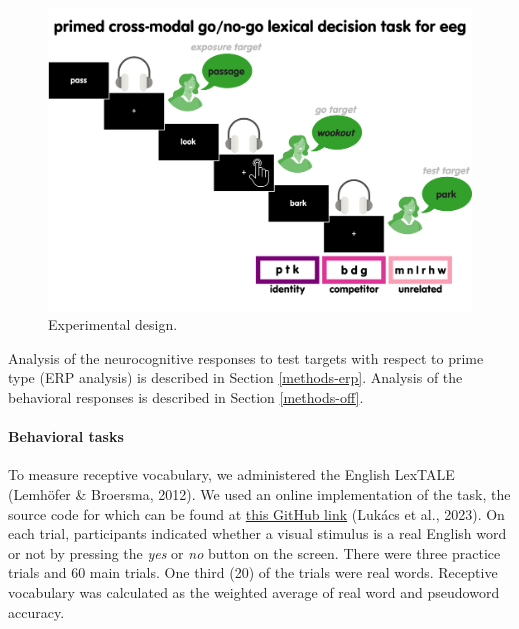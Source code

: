 \documentclass[
  12pt,
  twoside]{article}
\begin{document}
\begin{figure}[H]

{\centering \includegraphics[width=\textwidth]{figures/diss_eeg} 

}

\caption{Experimental design.}\label{fig:study2-fig}
\end{figure}

Analysis of the neurocognitive responses to test targets with respect to prime type (ERP analysis) is described in Section \ref{methods-erp}.
Analysis of the behavioral responses is described in Section \ref{methods-off}.

\hypertarget{behavioral-tasks}{%
\paragraph{Behavioral tasks}\label{behavioral-tasks}}

To measure receptive vocabulary, we administered the English LexTALE (Lemhöfer \& Broersma, 2012).
We used an online implementation of the task, the source code for which can be found at \href{https://github.com/gasparl/lextale}{this GitHub link} (Lukács et al., 2023).
On each trial, participants indicated whether a visual stimulus is a real English word or not by pressing the \emph{yes} or \emph{no} button on the screen.
There were three practice trials and 60 main trials.
One third (20) of the trials were real words.
Receptive vocabulary was calculated as the weighted average of real word and pseudoword accuracy.
\end{document}
